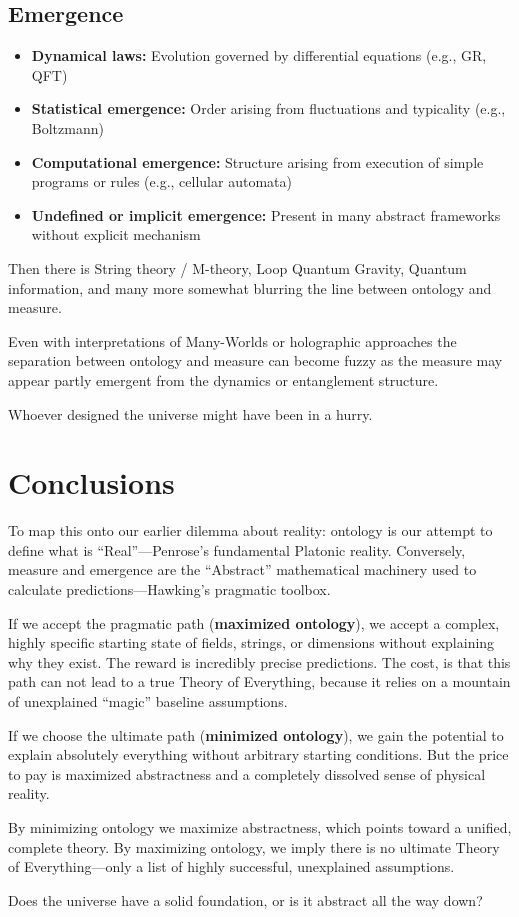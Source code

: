 \subsection*{Emergence}
\begin{itemize}
    \item \textbf{Dynamical laws:} Evolution governed by differential equations (e.g., GR, QFT)
    \item \textbf{Statistical emergence:} Order arising from fluctuations and typicality (e.g., Boltzmann)
    \item \textbf{Computational emergence:} Structure arising from execution of simple programs or rules (e.g., cellular automata)
    \item \textbf{Undefined or implicit emergence:} Present in many abstract frameworks without explicit mechanism
\end{itemize}


Then there is String theory / M-theory, Loop Quantum Gravity, Quantum information, and many more 
somewhat blurring the line between ontology and measure.

Even with interpretations of Many-Worlds or holographic approaches the separation between ontology and measure can become fuzzy as the measure may appear partly emergent from the dynamics or entanglement structure.

Whoever designed the universe might have been in a hurry.


\section{Conclusions}

To map this onto our earlier dilemma about reality: ontology is our attempt to define what is ``Real''---Penrose's fundamental Platonic reality. Conversely, measure and emergence are the ``Abstract'' mathematical machinery used to calculate predictions---Hawking's pragmatic toolbox.

If we accept the pragmatic path (\textbf{maximized ontology}), we accept a complex, highly specific starting state of fields, strings, or dimensions without explaining why they exist.
The reward is incredibly precise predictions.
The cost, is that this path can not lead to a true Theory of Everything, because it relies on a mountain of unexplained ``magic'' baseline assumptions.

If we choose the ultimate path (\textbf{minimized ontology}), we gain the potential to explain absolutely everything without arbitrary starting conditions.
But the price to pay is maximized abstractness and a completely dissolved sense of physical reality. 

By minimizing ontology we maximize abstractness, which points toward a unified, complete theory. By maximizing ontology, we imply there is no ultimate Theory of Everything---only a list of highly successful, unexplained assumptions. 

Does the universe have a solid foundation, or is it abstract all the way down?
